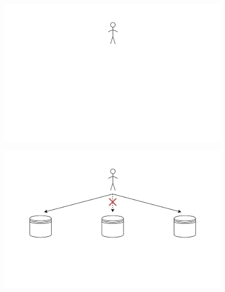 \documentclass[hyperref={pdfpagelabels=false}]{beamer}
\begin{document}
    \begin{frame}
        \begin{figure}[b]
            \centering
            \includegraphics[scale=.26]{idee_reconstruction_collaborative4}
        \end{figure}
    \end{frame}

    \begin{frame}
        \begin{figure}[b]
            \centering
            \includegraphics[scale=.26]{idee_reconstruction_collaborative5}
        \end{figure}
    \end{frame}
\end{document}
